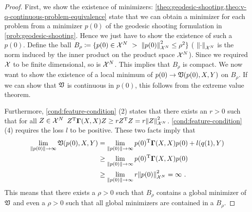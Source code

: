 \begin{proof}
	First, we show the existence of minimizers:
	\cref{theo:geodesic-shooting,theo:v-q-continuous-problem-equivalence} state that we can obtain a minimizer for each problem from a minimizer $p(0)$ of the geodesic shooting formulation in \cref{prob:geodesic-shooting}.
	Hence we just have to show the existence of such a $p(0)$.
	Define the ball $B_\rho \coloneqq \{p(0) \in \mathcal{X}^N\ > \ \norm{p(0)}_{\mathcal{X}^N}^2 \leq \rho^2 \}$ ( $\norm{\cdot}_{\mathcal{X}^N}$ is the norm induced by the inner product on the product space $\mathcal{X}^N$).
	Since we required $\mathcal{X}$ to be finite dimensional, so is $\mathcal{X}^N$.
	This implies that $B_\rho$ is compact.
	We now want to show the existence of a local minimum of $p(0) \rightarrow \mathfrak{V}(p(0), X, Y)$ on $B_\rho$.
	If we can show that $\mathfrak{V}$ is continuous in $p(0)$, this follows from the extreme value theorem.
	
	Furthermore, \cref{cond:feature-condition} (2) states that there exists an $r > 0$ such that for all $Z \in \mathcal{X}^N$ $Z^{\mathrm{T}} \mathbf{\Gamma}(X, X) Z \geq r Z^{\mathrm{T}} Z = r \norm{Z}_{\mathcal{X}^N}^2$.
	\cref{cond:feature-condition} (4) requires the loss $l$ to be positive.
	These two facts imply that
	\begin{align}
		\lim_{\norm{p(0)} \rightarrow \infty} \mathfrak{V}(p(0), X, Y) 
		&= \lim_{\norm{p(0)} \rightarrow \infty} p(0)^{\mathrm{T}} \mathbf{\Gamma}(X, X) p(0) + l(q(1), Y)\\
		& \geq 	\lim_{\norm{p(0)} \rightarrow \infty} p(0)^{\mathrm{T}} \mathbf{\Gamma}(X, X) p(0) \\
		& \geq \lim_{\norm{p(0)} \rightarrow \infty} r \norm{p(0)}_{\mathcal{X}^N}^2
		= \infty \ .
	\end{align}
	This means that there exists a $\rho > 0$ such that $B_\rho$ contains a global minimizer of $\mathfrak{V}$ and even a $\rho > 0$ such that all global minimizers are contained in a $B_\rho$.
	

\end{proof}

